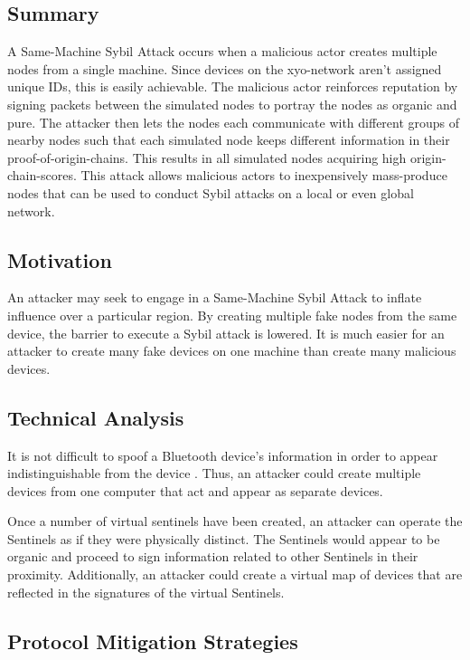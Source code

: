 \documentclass{article}
\begin{document}
\subsection{Summary}
A Same-Machine Sybil Attack occurs when a malicious actor creates multiple nodes from a single machine. Since devices on the \Gls{xyo-network} aren't assigned unique IDs, this is easily achievable. The malicious actor reinforces reputation by signing packets between the simulated nodes to portray the nodes as organic and pure. The attacker then lets the nodes each communicate with different groups of nearby nodes such that each simulated node keeps different information in their \Glspl{proof-of-origin-chain}. This results in all simulated nodes acquiring high \Glspl{origin-chain-score}. This attack allows malicious actors to inexpensively mass-produce nodes that can be used to conduct Sybil attacks on a local or even global network. 

\subsection{Motivation}

An attacker may seek to engage in a Same-Machine Sybil Attack to inflate influence over a particular region. By creating multiple fake nodes from the same device, the barrier to execute a Sybil attack is lowered. It is much easier for an attacker to create many fake devices on one machine than create many malicious devices.

\subsection{Technical Analysis}

It is not difficult to spoof a Bluetooth device's information in order to appear indistinguishable from the device \cite{haxf4rall-bluetooth}. Thus, an attacker could create multiple devices from one computer that act and appear as separate devices.

Once a number of virtual \Glspl{sentinel} have been created, an attacker can operate the Sentinels as if they were physically distinct. The Sentinels would appear to be organic and proceed to sign information related to other Sentinels in their proximity. Additionally, an attacker could create a virtual map of devices that are reflected in the signatures of the virtual Sentinels.

\subsection{Protocol Mitigation Strategies}
\end{document}
